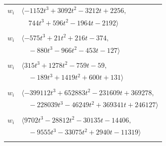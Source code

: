 \documentclass[11pt]{article}
\begin{document}
\begin{longtable}{@{}ll@{}}
$w_i$ & $\langle -1152t^{3}+3092t^{2}-3212t+2256,$\\
 & $\quad 744t^{3}+596t^{2}-1964t-2192\rangle$\\
\addlinespace[2pt]
\multicolumn{2}{@{}p{0.97\textwidth}@{}}{$i=66$, $D_i=1$, $\rho_{ij}$: $17{:}1, \allowbreak 18{:}1, \allowbreak 31{:}1, \allowbreak 42{:}1, \allowbreak 51{:}2, \allowbreak 65{:}2, \allowbreak 67{:}2, \allowbreak 85{:}2, \allowbreak 92{:}1$}\\
$w_i$ & $\langle -575t^{3}+21t^{2}+216t-374,$\\
 & $\quad -880t^{3}-966t^{2}-453t-127\rangle$\\
\addlinespace[2pt]
\multicolumn{2}{@{}p{0.97\textwidth}@{}}{$i=67$, $D_i=1$, $\rho_{ij}$: $3{:}1, \allowbreak 17{:}2, \allowbreak 18{:}2, \allowbreak 19{:}1, \allowbreak 27{:}2, \allowbreak 41{:}1, \allowbreak 52{:}1, \allowbreak 66{:}1, \allowbreak 71{:}2, \allowbreak 75{:}1, \allowbreak 81{:}1, \allowbreak 82{:}2, \allowbreak 83{:}1, \allowbreak 91{:}1$}\\
$w_i$ & $\langle 315t^{3}+1278t^{2}-759t-59,$\\
 & $\quad -189t^{3}+1419t^{2}+600t+131\rangle$\\
\addlinespace[2pt]
\multicolumn{2}{@{}p{0.97\textwidth}@{}}{$i=68$, $D_i=1$, $\rho_{ij}$: $0{:}2, \allowbreak 1{:}1, \allowbreak 5{:}2, \allowbreak 11{:}2, \allowbreak 17{:}1, \allowbreak 19{:}2, \allowbreak 26{:}1, \allowbreak 33{:}2, \allowbreak 36{:}1, \allowbreak 37{:}1, \allowbreak 39{:}2, \allowbreak 50{:}2, \allowbreak 52{:}2, \allowbreak 55{:}2, \allowbreak 60{:}1, \allowbreak 71{:}2, \allowbreak 72{:}2, \allowbreak 75{:}1, \allowbreak 78{:}2, \allowbreak 86{:}1, \allowbreak 89{:}1, \allowbreak 93{:}1, \allowbreak 95{:}1$}\\
$w_i$ & $\langle -399112t^{3}+652883t^{2}-231609t+369278,$\\
 & $\quad -228039t^{3}-46249t^{2}+369341t+246127\rangle$\\
\addlinespace[2pt]
\multicolumn{2}{@{}p{0.97\textwidth}@{}}{$i=69$, $D_i=1$, $\rho_{ij}$: $5{:}1, \allowbreak 18{:}1, \allowbreak 30{:}2, \allowbreak 31{:}2, \allowbreak 33{:}1, \allowbreak 34{:}2, \allowbreak 37{:}2, \allowbreak 60{:}1, \allowbreak 71{:}1, \allowbreak 74{:}2, \allowbreak 78{:}2, \allowbreak 79{:}1, \allowbreak 97{:}2$}\\
$w_i$ & $\langle 9702t^{3}-28812t^{2}-30135t-14406,$\\
 & $\quad -9555t^{3}-33075t^{2}+2940t-11319\rangle$\\
\addlinespace[2pt]

\end{longtable}
\end{document}
